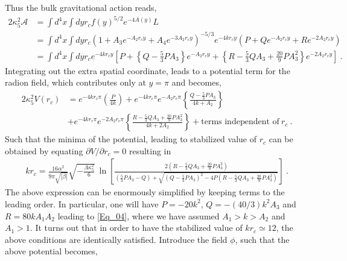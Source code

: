 \documentclass{article}
\begin{document}
Thus the bulk gravitational action reads,
\begin{align}
2\kappa _{5}^{2}\mathcal{A}&=\int d^{4}x\int dy r_{c}f(y)^{5/2}e^{-4A(y)}L
\nonumber
\\
&=\int d^{4}x\int dy r_{c} \left(1+A_{3}e^{-A_{2}r_{c}y}+A_{4}e^{-3A_{2}r_{c}y}\right)^{-5/3}e^{-4kr_{c}y}
\left(P+Qe^{-A_{2}r_{c}y}+Re^{-2A_{2}r_{c}y}\right)
\nonumber
\\
&=\int d^{4}x\int dy r_{c} e^{-4kr_{c}y}\left[P+\left\lbrace Q-\frac{5}{3}PA_{3} \right\rbrace e^{-A_{2}r_{c}y}
+\left\lbrace R-\frac{5}{3}QA_{3}+\frac{20}{9}PA_{3}^{2} \right\rbrace e^{-2A_{2}r_{c}y}\right]~.
\end{align}
Integrating out the extra spatial coordinate, leads to a potential term for the radion field, which contributes only at $y=\pi$ and becomes,
\begin{align}\label{App_Eq01}
2\kappa _{5}^{2}V(r_{c})&=e^{-4kr_{c}\pi}\left(\frac{P}{4k}\right)+e^{-4kr_{c}\pi}e^{-A_{2}r_{c}\pi}
\left\lbrace \frac{Q-\frac{5}{3}PA_{3}}{4k+A_{2}} \right\rbrace
\nonumber
\\
&+e^{-4kr_{c}\pi}e^{-2A_{2}r_{c}\pi}\left\lbrace \frac{R-\frac{5}{3}QA_{3}+\frac{20}{9}PA_{3}^{2}}{4k+2A_{2}}
\right\rbrace +\textrm{terms independent of}~r_{c}~.
\end{align}
Such that the minima of the potential, leading to stabilized value of $r_{c}$ can be obtained by equating $\partial V/\partial r_{c}=0$ resulting in 
\begin{align}
kr_{c}=\frac{16\alpha ^{2}}{9 \pi \sqrt{|\beta|}}\sqrt{-\frac{\Lambda \kappa _{5}^{2}}{6}}~\ln \left[\frac{2\left(R-\frac{5}{3}QA_{3}+\frac{20}{9}PA_{3}^{2}\right)}{\left(\frac{5}{3}PA_{3}-Q\right)+\sqrt{\left(Q-\frac{5}{3}PA_{3}\right)^{2}-4P\left(R-\frac{5}{3}QA_{3}+\frac{20}{9}PA_{3}^{2}\right)}} \right]~.
\end{align}
The above expression can be enormously simplified by keeping terms to the leading order. In particular, one will have $P=-20k^{2}$, $Q=-(40/3)k^{2}A_{3}$ and $R=80kA_{1}A_{2}$ leading to \ref{Eq_04}, where we have assumed $A_{1}>k>A_{2}$ and $A_{1}>1$. It turns out that in order to have the stabilized value of $kr_{c}\simeq 12$, the above conditions are identically satisfied. Introduce the field $\phi$, such that the above potential becomes,
\end{document}
